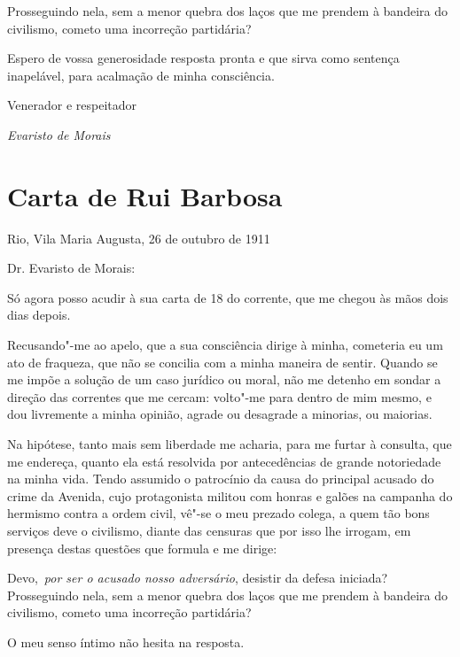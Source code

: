 Prosseguindo nela, sem a menor quebra dos laços que me prendem à
bandeira do civilismo, cometo uma incorreção partidária? 

Espero de vossa generosidade resposta pronta e que sirva como sentença
inapelável, para acalmação de minha consciência. 
\bigskip

\hfill{Venerador e respeitador} 
\bigskip

\hfill{\textit{Evaristo de Morais}}

\pagebreak

\section{Carta de Rui Barbosa}
\bigskip

\noindent Rio, Vila Maria Augusta, 26 de outubro de 1911 
\bigskip

\noindent Dr. Evaristo de Morais:
\bigskip

Só agora posso acudir à sua carta de 18 do corrente, que me chegou às
mãos dois dias depois. 

Recusando"-me ao apelo, que a sua consciência
dirige à minha, cometeria eu um ato de fraqueza, que não se concilia
com a minha maneira de sentir. Quando se me impõe a solução de um caso
jurídico ou moral, não me detenho em sondar a direção das correntes
que me cercam: volto"-me para dentro de mim mesmo, e dou livremente a
minha opinião, agrade ou desagrade a minorias, ou maiorias. 

Na hipótese, tanto mais sem liberdade me acharia, para me furtar à
consulta, que me endereça, quanto ela está resolvida por 
antecedências de grande notoriedade na minha vida. Tendo assumido o
patrocínio da causa do principal acusado do crime da Avenida, cujo
protagonista militou com honras e galões na campanha do hermismo contra
a ordem civil, vê"-se o meu prezado colega, a quem tão bons serviços
deve o civilismo, diante das censuras que por isso lhe irrogam, em
presença destas questões que formula e me dirige: 

\begin{hedraquote}
Devo, \textit{por ser
o acusado nosso adversário}, desistir da defesa iniciada? 
Prosseguindo nela, sem a menor quebra dos laços que me prendem à bandeira do
civilismo, cometo uma incorreção partidária? 
\end{hedraquote}

O meu senso íntimo não hesita na resposta. 

